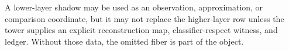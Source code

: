 \begin{principle}
\label{prin:unified-reality-no-shadow-replacement}
A lower-layer shadow may be used as an observation, approximation, or
comparison coordinate, but it may not replace the higher-layer row unless
the tower supplies an explicit reconstruction map, classifier-respect
witness, and ledger. Without those data, the omitted fiber is part of
the object.
\end{principle}

